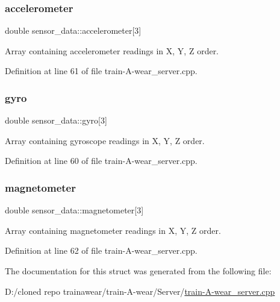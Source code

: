\subsubsection{\texorpdfstring{accelerometer}{accelerometer}}
{\footnotesize\ttfamily double sensor\+\_\+data\+::accelerometer\mbox{[}3\mbox{]}}



Array containing accelerometer readings in X, Y, Z order. 



Definition at line 61 of file train-\/\+A-\/wear\+\_\+server.\+cpp.

\mbox{\label{structsensor__data_a876645af25bff9b0d84d7e2b887e9e26}} 
\subsubsection{\texorpdfstring{gyro}{gyro}}
{\footnotesize\ttfamily double sensor\+\_\+data\+::gyro\mbox{[}3\mbox{]}}



Array containing gyroscope readings in X, Y, Z order. 



Definition at line 60 of file train-\/\+A-\/wear\+\_\+server.\+cpp.

\mbox{\label{structsensor__data_a1c61b803f50641039d93ff47f48cead2}} 
\subsubsection{\texorpdfstring{magnetometer}{magnetometer}}
{\footnotesize\ttfamily double sensor\+\_\+data\+::magnetometer\mbox{[}3\mbox{]}}



Array containing magnetometer readings in X, Y, Z order. 



Definition at line 62 of file train-\/\+A-\/wear\+\_\+server.\+cpp.



The documentation for this struct was generated from the following file\+:\begin{DoxyCompactItemize}
\item 
D\+:/cloned repo trainawear/train-\/\+A-\/wear/\+Server/\mbox{\hyperlink{train-_a-wear__server_8cpp}{train-\/\+A-\/wear\+\_\+server.\+cpp}}\end{DoxyCompactItemize}
